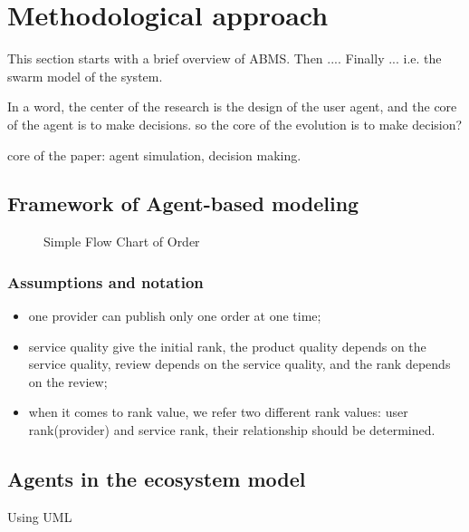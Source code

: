 \section{Methodological approach} %
\label{sec:methodological_approach}

This section starts with a brief overview of ABMS. Then .... Finally ... 
i.e. the swarm model of the system.

In a word, the center of the research is the design of the user agent, and the core of the agent is to make decisions. so the core of the evolution is to make decision? 

core of the paper: agent simulation, decision making.

\subsection{Framework of Agent-based modeling} %
\label{sub:framework of agent based modeling}
\begin{figure}[htbp]
\centering\small
{} \hspace{0.09\textwidth}
\caption{Simple Flow Chart of Order}
\end{figure}

\subsubsection{Assumptions and notation}
\begin{itemize}
    \item one provider can publish only one order at one time;
    \item service quality give the initial rank, the product quality depends on the service quality, review depends on the service quality, and the rank depends on the review;
    \item when it comes to rank value, we refer two different rank values: user rank(provider) and service rank, their relationship should be determined.
\end{itemize}


\subsection{Agents in the ecosystem model} %
\label{sub:agents_in_the_ecosystem_model}
Using UML 

